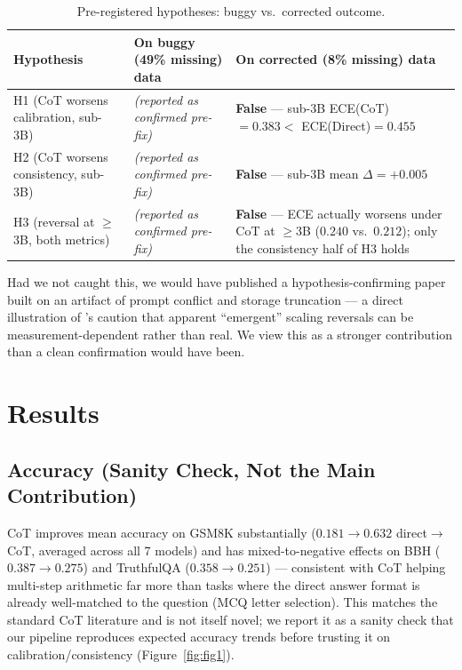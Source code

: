 \documentclass{article}
\begin{document}
\begin{table}[h]
\centering
\small
\caption{Pre-registered hypotheses: buggy vs.\ corrected outcome.}
\label{tab:hypotheses}
\begin{tabular}{p{2.6cm}p{4.6cm}p{4.6cm}}
\toprule
Hypothesis & On buggy (49\% missing) data & On corrected (8\% missing) data \\
\midrule
H1 (CoT worsens calibration, sub-3B) & \emph{(reported as confirmed pre-fix)} & \textbf{False} --- sub-3B ECE(CoT)$=0.383 <$ ECE(Direct)$=0.455$ \\
H2 (CoT worsens consistency, sub-3B) & \emph{(reported as confirmed pre-fix)} & \textbf{False} --- sub-3B mean $\Delta = +0.005$ \\
H3 (reversal at $\geq$3B, both metrics) & \emph{(reported as confirmed pre-fix)} & \textbf{False} --- ECE actually worsens under CoT at $\geq$3B ($0.240$ vs.\ $0.212$); only the consistency half of H3 holds \\
\bottomrule
\end{tabular}
\end{table}

Had we not caught this, we would have published a hypothesis-confirming paper built on an artifact of prompt conflict and storage truncation --- a direct illustration of \citet{schaeffer2023mirage}'s caution that apparent ``emergent'' scaling reversals can be measurement-dependent rather than real. We view this as a stronger contribution than a clean confirmation would have been.

\section{Results}

\subsection{Accuracy (Sanity Check, Not the Main Contribution)}
\label{sec:results-accuracy}

CoT improves mean accuracy on GSM8K substantially ($0.181 \to 0.632$ direct$\to$CoT, averaged across all 7 models) and has mixed-to-negative effects on BBH ($0.387 \to 0.275$) and TruthfulQA ($0.358 \to 0.251$) --- consistent with CoT helping multi-step arithmetic far more than tasks where the direct answer format is already well-matched to the question (MCQ letter selection). This matches the standard CoT literature and is not itself novel; we report it as a sanity check that our pipeline reproduces expected accuracy trends before trusting it on calibration/consistency (Figure~\ref{fig:fig1}).
\end{document}
